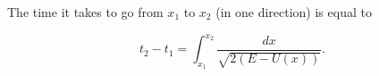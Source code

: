 The time it takes to go from $x_1$ to $x_2$ (in one direction) is equal to

$$t_2 - t_1 = \int_{x_1}^{x_2} \frac{dx}{\sqrt{2(E - U(x))}}.$$
